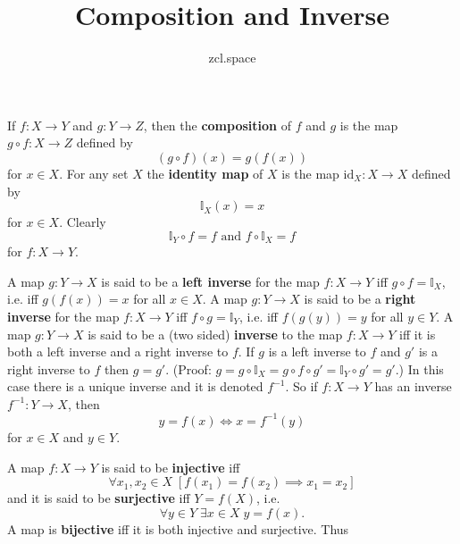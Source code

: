 \documentclass[10pt,a4paper,UTF8]{article}
\author{zcl.space}
\date{}
\title{Composition and Inverse}
\begin{document}
\maketitle
\tableofcontents
{}
 If \(f:X\to Y\) and \(g:Y\to Z\), then the \textbf{composition}
of \(f\) and \(g\) is the map \(g\circ f:X\to Z\) defined by
$$
    (g\circ f)(x)=g(f(x))
$$
for \(x\in X\).
For any set \(X\) the \textbf{identity map}  of \(X\)
is the map \(\mathrm{id}_X:X\to X\) defined by
$$
  \mathbb{I}_X(x)=x
$$
for \(x\in X\).  Clearly
$$
    \mathbb{I}_Y\circ f = f \mbox{ and } f\circ \mathbb{I}_X=f
$$
for \(f:X\to Y\).

A map \(g:Y\to X\) is said to be
a \textbf{left inverse}
for the map \(f:X\to Y\) iff \(g\circ f= \mathbb{I}_X\), i.e.
iff \(g(f(x))=x\) for all \(x\in X\).
A map \(g:Y\to X\) is said to be a \textbf{right inverse}
for the map \(f:X\to Y\) iff \(f\circ g=\mathbb{I}_Y\), i.e.
iff \(f(g(y))=y\) for all \(y\in Y\).
A map \(g:Y\to X\) is said to be  a (two sided) \textbf{inverse}
to the map \(f:X\to Y\) iff it is both
a left inverse and a right inverse to \(f\).
 If \(g\) is a left inverse to \(f\) and \(g'\) is a right inverse
to \(f\) then \(g=g'\).
(Proof: \(g=g\circ \mathbb{I}_X=g\circ f\circ g'=\mathbb{I}_Y\circ g'=g'\).)
In this case there is a unique inverse and it is denoted \(f^{-1}\).
So if \(f:X\to Y\) has an inverse \(f^{-1}:Y\to X\), then
$$
           y=f(x)\iff x=f^{-1}(y)
$$
for \(x\in X\) and \(y\in Y\).

 A map \(f:X\to Y\) is said to be \textbf{injective}
iff
$$
  \forall x_1,x_2\in X\;[f(x_1)=f(x_2)\implies x_1=x_2]
$$
and it is said to be \textbf{surjective}  iff \(Y=f(X)\), i.e.
$$
\forall y\in Y\;\exists x\in X\; y=f(x).
$$
A map is \textbf{bijective}  iff it is both injective and surjective.
Thus
\end{document}
